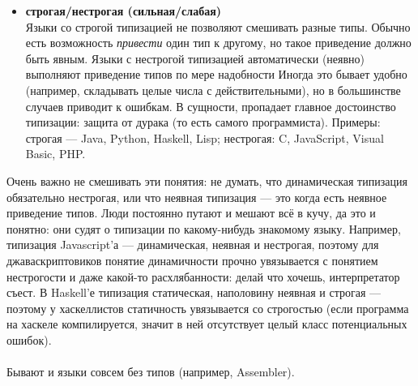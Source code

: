 \documentclass[11pt]{book}
\begin{document}
\begin{itemize}
\begin{itemize}
    \item \textbf{строгая/нестрогая (сильная/слабая)}
        \\
        Языки со строгой типизацией не позволяют смешивать разные типы.
        Обычно есть возможность \emph{привести} один тип к другому, но такое приведение должно быть явным.
        Языки с нестрогой типизацией автоматически (неявно) выполняют приведение типов по мере надобности
        Иногда это бывает удобно (например, складывать целые числа с действительными), но в большинстве случаев приводит к ошибкам.
        В сущности, пропадает главное достоинство типизации: защита от дурака (то есть самого программиста).
        Примеры: строгая --- Java, Python, Haskell, Lisp; нестрогая: C, JavaScript, Visual Basic, PHP.
    \end{itemize}
    Очень важно не смешивать эти понятия: не думать, что динамическая типизация обязательно нестрогая,
    или что неявная типизация --- это когда есть неявное приведение типов.
    Люди постоянно путают и мешают всё в кучу, да это и понятно: они судят о типизации по какому-нибудь знакомому языку.
    Например, типизация Javascript'а --- динамическая, неявная и нестрогая,
    поэтому для джаваскриптовиков понятие динамичности прочно увязывается с понятием нестрогости и даже какой-то расхлябанности:
    делай что хочешь, интерпретатор съест.
    В Haskell'е типизация статическая, наполовину неявная и строгая --- поэтому у хаскеллистов статичность увязывается со строгостью
    (если программа на хаскеле компилируется, значит в ней отсутствует целый класс потенциальных ошибок).
    \\ \\
    Бывают и языки совсем без типов (например, Assembler).


\end{itemize}
\end{document}
